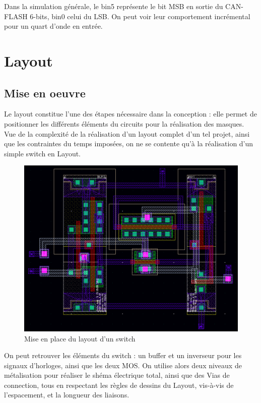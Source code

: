 \documentclass[11pt]{article}
\begin{document}
Dans la simulation g\'en\'erale, le bin5 repr\'esente le bit MSB en sortie du CAN-FLASH 6-bits, bin0 celui du LSB. On peut voir leur comportement incr\'emental pour un quart d'onde en entr\'ee. 

\clearpage

\section{Layout}
\subsection{Mise en oeuvre}

Le layout constitue l'une des \'etapes n\'ecessaire dans la conception : elle permet de positionner
les diff\'erents \'el\'ements du circuits pour la r\'ealisation des masques.
Vue de la complexit\'e de la r\'ealisation d'un layout complet d'un tel projet, ainsi que les contraintes
du temps impos\'ees, on ne se contente qu'\`a la r\'ealisation d'un simple switch en Layout.

\begin{figure}[!htb]
      \centering
      \includegraphics[width=\linewidth]{layout_.png}
      \caption{Mise en place du layout d'un switch}
\end{figure}%

On peut retrouver les \'el\'ements du switch : un buffer et un inverseur pour les signaux d'horloges, ainsi que les deux MOS. On utilise alors deux niveaux de m\'etalisation pour r\'ealiser le sh\'ema \'electrique total, ainsi que des Vias de connection, tous en respectant les r\`egles de dessins du Layout, vis-\`a-vis de l'espacement, et la longueur des liaisons.
\end{document}
